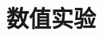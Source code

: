 \documentclass[main.tex]{subfiles}
\begin{document}
\chapter{数值实验}\label{chp:experiments}
\end{document}

